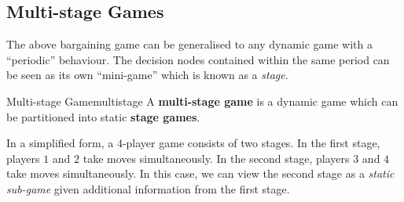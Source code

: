 \documentclass[math]{amznotes}
\theoremstyle{remark}
\begin{document}
\subsection{Multi-stage Games}
The above bargaining game can be generalised to any dynamic game with a ``periodic'' behaviour. The decision nodes contained within the same period can be seen as its own ``mini-game'' which is known as a \textit{stage}.
\begin{dfnbox}{Multi-stage Game}{multistage}
    A {\color{red} \textbf{multi-stage game}} is a dynamic game which can be partitioned into static {\color{red} \textbf{stage games}}.
\end{dfnbox}
In a simplified form, a $4$-player game consists of two stages. In the first stage, players $1$ and $2$ take moves simultaneously. In the second stage, players $3$ and $4$ take moves simultaneously. In this case, we can view the second stage as a \textit{static sub-game} given additional information from the first stage.
\end{document}
